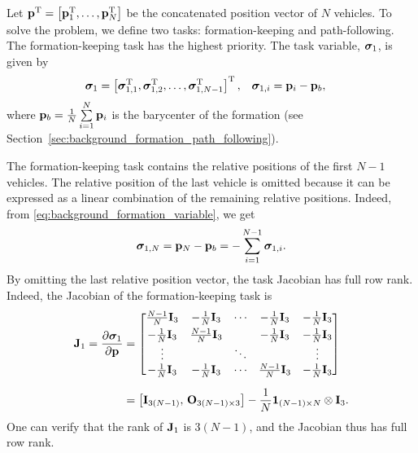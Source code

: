 Let $\mathbf{p}^{\mathrm{T}} = \left[\mathbf{p}_1^{\mathrm{T}}, \ldots, \mathbf{p}_N^{\mathrm{T}}\right]$ be the concatenated position vector of $N$ vehicles.
To solve the problem, we define two tasks: formation-keeping and path-following.
The formation-keeping task has the highest priority.
The task variable, $\bm{\sigma}_1$, is given by
\begin{align}
    \bm{\sigma}_1 &= \left[\bm{\sigma}_{1, 1}^{\mathrm{T}}, \bm{\sigma}_{1, 2}^{\mathrm{T}}, \ldots, \bm{\sigma}_{1, N-1}^{\mathrm{T}}\right]^{\mathrm{T}}, &
    \bm{\sigma}_{1, i} &= \mathbf{p}_i - \mathbf{p}_b,
    \label{eq:background_formation_variable}
\end{align}
where $\mathbf{p}_b = \frac{1}{N}\sum\limits_{i=1}^N \mathbf{p}_i$ is the barycenter of the formation (see Section~\ref{sec:background_formation_path_following}).

\begin{rmk*}
    The formation-keeping task contains the relative positions of the first $N-1$ vehicles.
    The relative position of the last vehicle is omitted because it can be expressed as a linear combination of the remaining relative positions.
    Indeed, from \eqref{eq:background_formation_variable}, we get
    \begin{equation}
        \bm{\sigma}_{1, N} = \mathbf{p}_N - \mathbf{p}_b = - \sum_{i=1}^{N-1} \bm{\sigma}_{1, i}.
    \end{equation}
    By omitting the last relative position vector, the task Jacobian has full row rank.
    Indeed, the Jacobian of the formation-keeping task is
    \begin{equation}
        \begin{split}
            \mathbf{J}_1 = \frac{\partial \bm{\sigma}_1}{\partial \mathbf{p}} &= 
            \begin{bmatrix}
                \frac{N-1}{N} \mathbf{I}_3 & -\frac{1}{N} \mathbf{I}_3 & \cdots & -\frac{1}{N} \mathbf{I}_3 & -\frac{1}{N} \mathbf{I}_3 \\[3pt]
                -\frac{1}{N} \mathbf{I}_3 & \frac{N-1}{N} \mathbf{I}_3 & & -\frac{1}{N} \mathbf{I}_3 & -\frac{1}{N} \mathbf{I}_3 \\ 
                \vdots & & \ddots & & \vdots \\
                -\frac{1}{N} \mathbf{I}_3 & -\frac{1}{N} \mathbf{I}_3 & \cdots & \frac{N-1}{N} \mathbf{I}_3 & -\frac{1}{N} \mathbf{I}_3
            \end{bmatrix} \\[6pt]
            &= \left[\mathbf{I}_{3(N-1)},\, \mathbf{O}_{3(N-1) \times 3}\right] - \frac{1}{N} \mathbf{1}_{(N-1) \times N} \otimes \mathbf{I}_3.
        \end{split}
        \label{eq:background_NSB_formation_jacobian}
    \end{equation}
    One can verify that the rank of $\mathbf{J}_1$ is $3(N-1)$, and the Jacobian thus has full row rank.
\end{rmk*}

